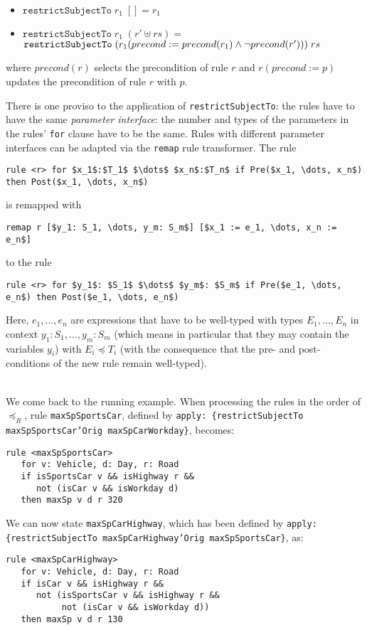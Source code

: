 \begin{itemize}
\item $\mathtt{restrictSubjectTo}\; r_1\; [] = r_1$
\item $\mathtt{restrictSubjectTo}\; r_1\; (r' \uplus rs) =$\\
  $\mathtt{restrictSubjectTo}\; (r_1(precond := precond(r_1) \land \lnot precond(r')))\; rs$
\end{itemize}
where $precond(r)$ selects the precondition of rule $r$ and $r(precond:=p)$
updates the precondition of rule $r$ with $p$.

There is one proviso to the application of \texttt{restrictSubjectTo}: the
rules have to have the same \emph{parameter interface}: the number and types
of the parameters in the rules' \texttt{for} clause have to be the same.
Rules with different parameter interfaces can be adapted via the
\texttt{remap} rule transformer. The rule 

\begin{lstlisting}[frame=none,mathescape=true]
rule <r> for $x_1$:$T_1$ $\dots$ $x_n$:$T_n$ if Pre($x_1, \dots, x_n$) then Post($x_1, \dots, x_n$)
\end{lstlisting}
is remapped with 
\begin{lstlisting}[frame=none,mathescape=true]
remap r [$y_1: S_1, \dots, y_m: S_m$] [$x_1 := e_1, \dots, x_n := e_n$]
\end{lstlisting}
to the rule
\begin{lstlisting}[frame=none,mathescape=true]
rule <r> for $y_1$: $S_1$ $\dots$ $y_m$: $S_m$ if Pre($e_1, \dots, e_n$) then Post($e_1, \dots, e_n$)
\end{lstlisting}
Here, $e_1, \dots, e_n$ are expressions that have to be well-typed with types $E_1, \dots, E_n$ in
context $y_1: S_1, \dots, y_m: S_m$ (which means in particular that they may
contain the variables $y_i$) with $E_i \preceq T_i$ (with the consequence that
the pre- and post-conditions of the new rule remain well-typed). 


\begin{example}\mbox{}\\
We come back to the running example. When processing the rules in the order of
$\preceq_R$, rule \texttt{maxSpSportsCar}, defined by
\texttt{apply: \{restrictSubjectTo maxSpSportsCar'Orig maxSpCarWorkday\}},
becomes:
\begin{lstlisting}
rule <maxSpSportsCar>
   for v: Vehicle, d: Day, r: Road
   if isSportsCar v && isHighway r &&
      not (isCar v && isWorkday d)
   then maxSp v d r 320
 \end{lstlisting}

 We can now state \texttt{maxSpCarHighway}, which has been defined by
 \texttt{apply: \{restrictSubjectTo maxSpCarHighway'Orig maxSpSportsCar\}}, as:

 \begin{lstlisting}
rule <maxSpCarHighway>
   for v: Vehicle, d: Day, r: Road
   if isCar v && isHighway r &&
      not (isSportsCar v && isHighway r &&
           not (isCar v && isWorkday d))
   then maxSp v d r 130
\end{lstlisting}
\end{example}

